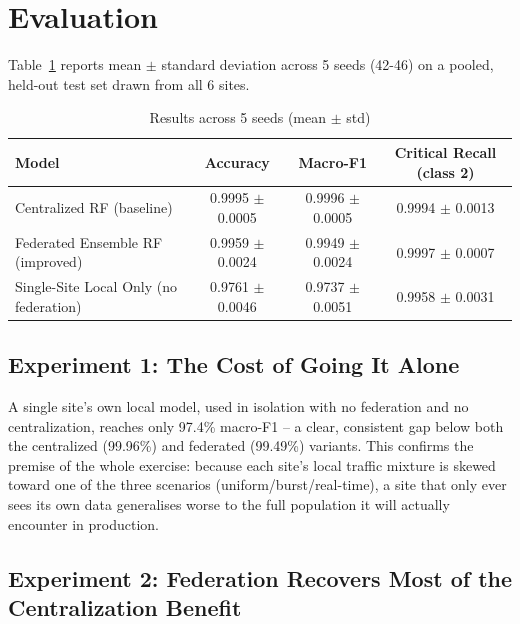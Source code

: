 
\section{Evaluation}
\label{sec:Evaluation}

Table~\ref{tab:results} reports mean $\pm$ standard deviation across 5 seeds (42-46) on a pooled, held-out test set drawn from all 6 sites.

\begin{table}[htp]
\centering
\caption{Results across 5 seeds (mean $\pm$ std)}
\label{tab:results}
\begin{tabular}{lccc}
\hline
Model & Accuracy & Macro-F1 & Critical Recall (class 2) \\
\hline
Centralized RF (baseline) & 0.9995 $\pm$ 0.0005 & 0.9996 $\pm$ 0.0005 & 0.9994 $\pm$ 0.0013 \\
Federated Ensemble RF (improved) & 0.9959 $\pm$ 0.0024 & 0.9949 $\pm$ 0.0024 & 0.9997 $\pm$ 0.0007 \\
Single-Site Local Only (no federation) & 0.9761 $\pm$ 0.0046 & 0.9737 $\pm$ 0.0051 & 0.9958 $\pm$ 0.0031 \\
\hline
\end{tabular}
\end{table}

\subsection{Experiment 1: The Cost of Going It Alone}
\label{sec:evalOne}

A single site's own local model, used in isolation with no federation and no centralization, reaches only 97.4\% macro-F1 -- a clear, consistent gap below both the centralized (99.96\%) and federated (99.49\%) variants. This confirms the premise of the whole exercise: because each site's local traffic mixture is skewed toward one of the three scenarios (uniform/burst/real-time), a site that only ever sees its own data generalises worse to the full population it will actually encounter in production.

\subsection{Experiment 2: Federation Recovers Most of the Centralization Benefit}
\label{sec:evalTwo}

